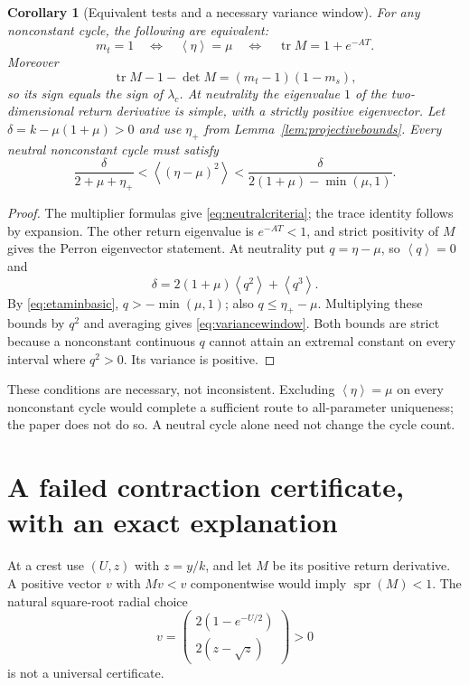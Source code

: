 \documentclass[11pt,a4paper]{article}
\numberwithin{equation}{section}
\newtheorem{corollary}[theorem]{Corollary}
\theoremstyle{remark}\newtheorem{remark}[theorem]{Remark}
\newcommand{\avg}[1]{\left\langle #1\right\rangle}
\DeclareMathOperator{\tr}{tr}
\DeclareMathOperator{\spr}{spr}
\begin{document}
\begin{corollary}[Equivalent tests and a necessary variance window]\label{cor:neutralconditions}
For any nonconstant cycle, the following are equivalent:
\begin{equation}\label{eq:neutralcriteria}
m_t=1\quad\Longleftrightarrow\quad\avg\eta=\mu
\quad\Longleftrightarrow\quad\tr M=1+e^{-AT}.
\end{equation}
Moreover
\[
\tr M-1-\det M=(m_t-1)(1-m_s),
\]
so its sign equals the sign of $\lambda_c$. At neutrality the eigenvalue $1$ of the two-dimensional return derivative is simple, with a strictly positive eigenvector.
Let $\delta=k-\mu(1+\mu)>0$ and use $\eta_+$ from Lemma~\ref{lem:projectivebounds}. Every neutral nonconstant cycle must satisfy
\begin{equation}\label{eq:variancewindow}
\frac{\delta}{2+\mu+\eta_+}
<\avg{(\eta-\mu)^2}
<\frac{\delta}{2(1+\mu)-\min(\mu,1)}.
\end{equation}
\end{corollary}
\begin{proof}
The multiplier formulas give \eqref{eq:neutralcriteria}; the trace identity follows by expansion. The other return eigenvalue is $e^{-AT}<1$, and strict positivity of $M$ gives the Perron eigenvector statement.
At neutrality put $q=\eta-\mu$, so $\avg q=0$ and
\[
\delta=2(1+\mu)\avg{q^2}+\avg{q^3}.
\]
By \eqref{eq:etaminbasic}, $q>-\min(\mu,1)$; also $q\le\eta_+-\mu$. Multiplying these bounds by $q^2$ and averaging gives \eqref{eq:variancewindow}. Both bounds are strict because a nonconstant continuous $q$ cannot attain an extremal constant on every interval where $q^2>0$. Its variance is positive.
\end{proof}
These conditions are necessary, not inconsistent. Excluding $\avg\eta=\mu$ on every nonconstant cycle would complete a sufficient route to all-parameter uniqueness; the paper does not do so. A neutral cycle alone need not change the cycle count.

\section{A failed contraction certificate, with an exact explanation}\label{sec:failed}
At a crest use $(U,z)$ with $z=y/k$, and let $M$ be its positive return derivative. A positive vector $v$ with $Mv<v$ componentwise would imply $\spr(M)<1$. The natural square-root radial choice
\begin{equation}\label{eq:radial}
v=\begin{pmatrix}2(1-e^{-U/2})\\2(z-\sqrt z)\end{pmatrix}>0
\end{equation}
is not a universal certificate.
\end{document}
